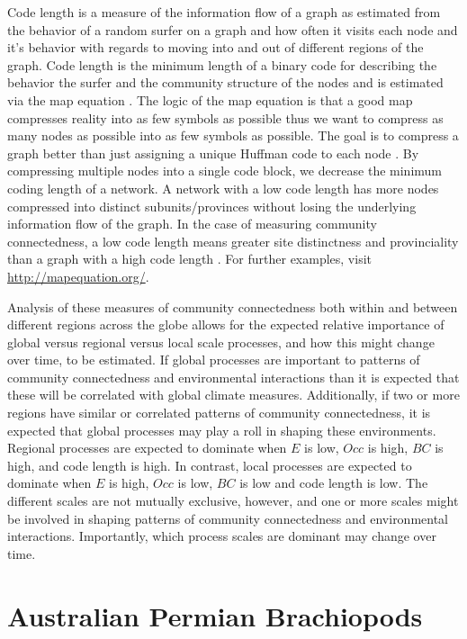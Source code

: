 \documentclass[12pt,letterpaper]{article}
\begin{document}
Code length is a measure of the information flow \citep{Shannon1948} of a graph as estimated from the behavior of a random surfer \citep{Brin1998} on a graph and how often it visits each node and it's behavior with regards to moving into and out of different regions of the graph. Code length is the minimum length of a binary code for describing the behavior the surfer and the community structure of the nodes and is estimated via the map equation \citep{Rosvall2008,Rosvall2009a}. The logic of the map equation is that a good map compresses reality into as few symbols as possible thus we want to compress as many nodes as possible into as few symbols as possible. The goal is to compress a graph better than just assigning a unique Huffman code to each node \citep{Huffman1952,Rosvall2008}. By compressing multiple nodes into a single code block, we decrease the minimum coding length of a network. A network with a low code length has more nodes compressed into distinct subunits/provinces without losing the underlying information flow of the graph. In the case of measuring community connectedness, a low code length means greater site distinctness and provinciality than a graph with a high code length \citep{Sidor2013}. For further examples, visit \url{http://mapequation.org/}.

Analysis of these measures of community connectedness both within and between different regions across the globe allows for the expected relative importance of global versus regional versus local scale processes, and how this might change over time, to be estimated. If global processes are important to patterns of community connectedness and environmental interactions than it is expected that these will be correlated with global climate measures. Additionally, if two or more regions have similar or correlated patterns of community connectedness, it is expected that global processes may play a roll in shaping these environments. Regional processes are expected to dominate when \(E\) is low, \(Occ\) is high, \(BC\) is high, and code length is high. In contrast, local processes are expected to dominate when \(E\) is high, \(Occ\) is low, \(BC\) is low and code length is low. The different scales are not mutually exclusive, however, and one or more scales might be involved in shaping patterns of community connectedness and environmental interactions. Importantly, which process scales are dominant may change over time.

\clearpage

\section{Australian Permian Brachiopods} \label{sec:brac}
\end{document}

